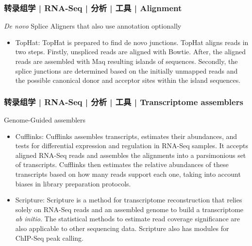 \begin{frame}
  \frametitle{转录组学 | RNA-Seq | 分析 | 工具 | Alignment}
  \begin{block}{\textit{De novo} Splice Aligners that also use annotation optionally}
    \begin{itemize}
      \item TopHat: TopHat is prepared to find de novo junctions. TopHat aligns reads in two steps. Firstly, unspliced reads are aligned with Bowtie. After, the aligned reads are assembled with Maq resulting islands of sequences. Secondly, the splice junctions are determined based on the initially unmapped reads and the possible canonical donor and acceptor sites within the island sequences.
    \end{itemize}
  \end{block}
\end{frame}

\begin{frame}
  \frametitle{转录组学 | RNA-Seq | 分析 | 工具 | Transcriptome assemblers}
  \begin{block}{Genome-Guided assemblers}
    \begin{itemize}
      \item Cufflinks: Cufflinks assembles transcripts, estimates their abundances, and tests for differential expression and regulation in RNA-Seq samples. It accepts aligned RNA-Seq reads and assembles the alignments into a parsimonious set of transcripts. Cufflinks then estimates the relative abundances of these transcripts based on how many reads support each one, taking into account biases in library preparation protocols.
      \item Scripture: Scripture is a method for transcriptome reconstruction that relies solely on RNA-Seq reads and an assembled genome to build a transcriptome \textit{ab initio}. The statistical methods to estimate read coverage significance are also applicable to other sequencing data. Scripture also has modules for ChIP-Seq peak calling.
    \end{itemize}
  \end{block}
\end{frame}

